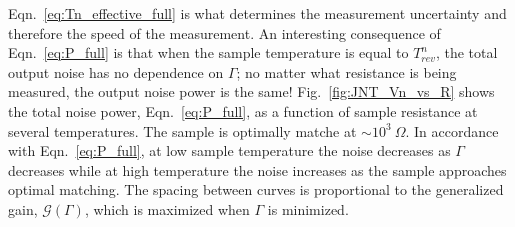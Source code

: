 Eqn.~\ref{eq:Tn_effective_full} is what determines the measurement uncertainty and therefore the speed of the measurement. An interesting consequence of Eqn.~\ref{eq:P_full} is that when the sample temperature is equal to $T_{rev}^n$, the total output noise has no dependence on $\Gamma$; no matter what resistance is being measured, the output noise power is the same! Fig.~\ref{fig:JNT_Vn_vs_R} shows the total noise power, Eqn.~\ref{eq:P_full}, as a function of sample resistance at several temperatures. The sample is optimally matche at ${\sim}10^3~\Omega$. In accordance with Eqn.~\ref{eq:P_full}, at low sample temperature the noise decreases as $\Gamma$ decreases while at high temperature the noise increases as the sample approaches optimal matching. The spacing between curves is proportional to the generalized gain, $\mathcal{G}(\Gamma)$, which is maximized when $\Gamma$ is minimized.

